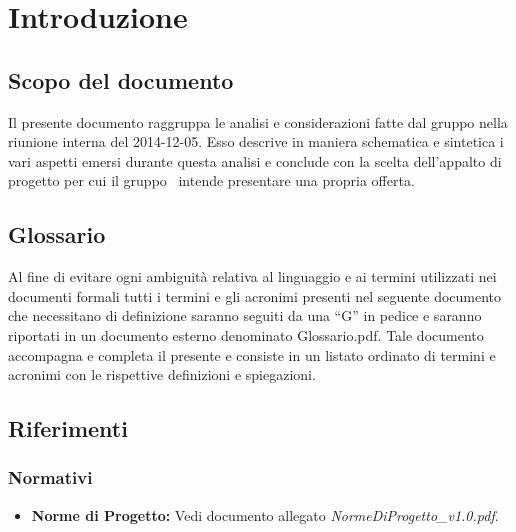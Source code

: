 \section{Introduzione}
\subsection{Scopo del documento}
Il presente documento raggruppa le analisi e considerazioni fatte dal gruppo nella
riunione interna del 2014-12-05. Esso descrive in maniera schematica e sintetica i
vari aspetti emersi durante questa analisi e conclude con la scelta dell'appalto di
progetto per cui il gruppo \gruppo\ intende presentare una propria offerta. 

\subsection{Glossario}

Al fine di evitare ogni ambiguità relativa al linguaggio e ai termini utilizzati nei documenti formali tutti i termini e gli acronimi presenti nel seguente documento che necessitano di definizione saranno seguiti da una ``G'' in pedice e saranno riportati in un documento esterno denominato Glossario.pdf. Tale documento accompagna e completa il presente e consiste in un listato ordinato di termini e acronimi con le rispettive definizioni e spiegazioni.

\subsection{Riferimenti}
\subsubsection{Normativi}
\begin{itemize}
	\item \textbf{Norme di Progetto:} Vedi documento allegato \textit{NormeDiProgetto\_v1.0.pdf}.
\end{itemize}
